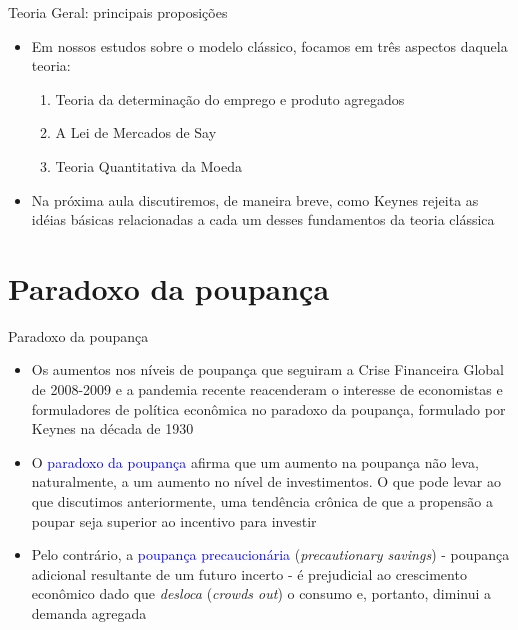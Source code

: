 \documentclass[10pt]{beamer}
\begin{document}
\begin{frame}{Teoria Geral: principais proposições}
    \begin{itemize}
        \item Em nossos estudos sobre o modelo clássico, focamos em três aspectos daquela teoria:
        \bigskip
        \begin{enumerate}
            \item Teoria da determinação do emprego e produto agregados
            \medskip
            \item A Lei de Mercados de Say
            \medskip
            \item Teoria Quantitativa da Moeda
        \end{enumerate}
        \medskip
        \item Na próxima aula discutiremos, de maneira breve, como Keynes rejeita as idéias básicas relacionadas a cada um desses fundamentos da teoria clássica
    \end{itemize}
\end{frame}

\section{Paradoxo da poupança}
\begin{frame}{Paradoxo da poupança}
    \begin{itemize}
        \item Os aumentos nos níveis de poupança que seguiram a Crise Financeira Global de 2008-2009 e a pandemia recente reacenderam o interesse de economistas e formuladores de política econômica no paradoxo da poupança, formulado por Keynes na década de 1930
        \bigskip
        \item O \textcolor{blue}{paradoxo da poupança} afirma que um aumento na poupança não leva, naturalmente, a um aumento no nível de investimentos. O que pode levar ao que discutimos anteriormente, uma tendência crônica de que a propensão a poupar seja superior ao incentivo para investir
        \bigskip
        \item Pelo contrário, a \textcolor{blue}{poupança precaucionária} (\emph{precautionary savings}) - poupança adicional resultante de um futuro incerto - é prejudicial ao crescimento econômico dado que \emph{desloca} (\emph{crowds out}) o consumo e, portanto, diminui a demanda agregada
    \end{itemize}
\end{frame}
\end{document}
